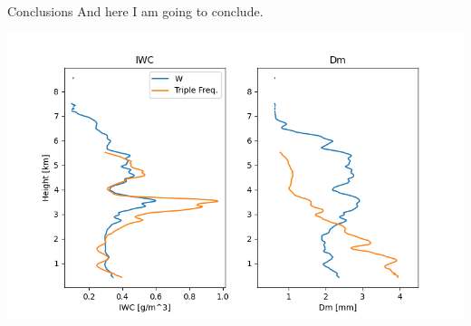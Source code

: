\documentclass[final,t]{beamer}
\begin{document}
\begin{frame}
\begin{columns}[]

  \begin{column}{.32\linewidth}

  \begin{block}{Conclusions}
   And here I am going to conclude.
  \end{block}
  
   \centerline{\includegraphics[scale=1.25]{retrievedProfs.png}}
  \end{column}

  \end{columns}

\end{frame}
\end{document}
